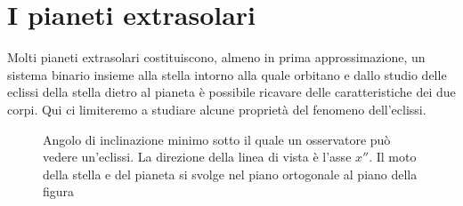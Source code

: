 \section{I pianeti extrasolari}
\label{sec:extrasolari}

Molti pianeti extrasolari costituiscono, almeno in prima approssimazione, un
sistema binario insieme alla stella intorno alla quale orbitano e dallo studio
delle eclissi della stella dietro al pianeta è possibile ricavare delle
caratteristiche dei due corpi. Qui ci limiteremo a studiare alcune proprietà del
fenomeno dell'eclissi.

\begin{figure}
  \centering
  \caption[Angolo di inclinazione minimo sotto il quale un osservatore può
  vedere
  un'eclissi]{Angolo di inclinazione minimo sotto il quale un osservatore può
    vedere un'eclissi. La direzione della linea di vista è l'asse $x''$. Il moto
    della stella e del pianeta si svolge nel piano ortogonale al piano della
    figura}
  \label{fig:minimo-angolo-eclissi}
\end{figure}

